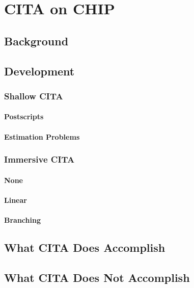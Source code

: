 \chapter[Chapter 5: CITA on CHIP]{CITA on CHIP}

\section{Background}

\section{Development}

\subsection{Shallow CITA}
\subsubsection{Postscripts}
\subsubsection{Estimation Problems}

\subsection{Immersive CITA}
\subsubsection{None}
\subsubsection{Linear}
\subsubsection{Branching}

\section{What CITA Does Accomplish}

\section{What CITA Does Not Accomplish}